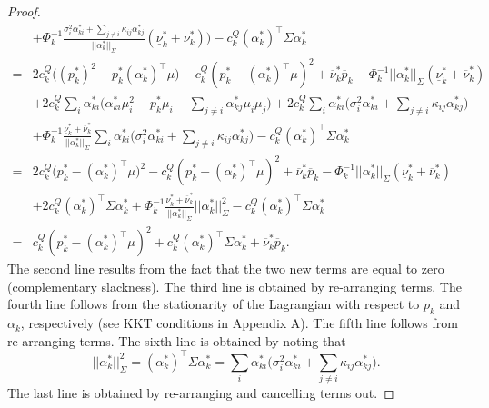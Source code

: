\documentclass{article}
\begin{document}
\begin{proof}
\begin{align*}
    &+ \Phi_k^{-1} \frac{\sigma_i^2 \alpha_{ki}^* + \sum_{j \ne i} \kappa_{ij} \alpha_{kj}^*}{||\alpha_k^*||_\Sigma}(\underline{\nu}_k^* +\overline{\nu}_k^*)\Big) - c_k^Q (\alpha_k^*)^\top\Sigma \alpha_k^*\\
    =& 2c_k^Q\big((p_k^*)^2 - p_k^*(\alpha_k^*)^\top \mu\big) - c_k^Q(p_k^* - (\alpha_k^*)^\top \mu)^2 + \overline{\nu}_k^* \overline{p}_k - \Phi_k^{-1}||\alpha_k^*||_{\Sigma} (\underline{\nu}_k^* + \overline{\nu}_k^*)\\ 
    &+ 2c_k^Q \sum_i \alpha_{ki}^*\big(\alpha_{ki}^*\mu_i^2 - p_k^* \mu_i - \sum_{j \ne i} \alpha_{kj}^* \mu_i \mu_j)  + 2c_k^Q \sum_i \alpha_{ki}^* \big(\sigma_i^2 \alpha_{ki}^* + \sum_{j \ne i} \kappa_{ij} \alpha_{kj}^*\big)\\
    &+ \Phi_k^{-1}\frac{\underline{\nu}_k^* +\overline{\nu}_k^*}{||\alpha_k^*||_\Sigma} \sum_i \alpha_{ki}^*\big(\sigma_i^2 \alpha_{ki}^* + \sum_{j \ne i} \kappa_{ij} \alpha_{kj}^*\big) - c_k^Q (\alpha_k^*)^\top\Sigma \alpha_k^*\\
    =& 2c_k^Q\big(p_k^* - (\alpha_k^*)^\top \mu\big)^2 - c_k^Q(p_k^* - (\alpha_k^*)^\top \mu)^2 + \overline{\nu}_k^* \overline{p}_k - \Phi_k^{-1}||\alpha_k^*||_{\Sigma} (\underline{\nu}_k^* + \overline{\nu}_k^*)\\ 
    &+ 2c_k^Q (\alpha_{k}^*)^\top \Sigma \alpha_k^* + \Phi_k^{-1}\frac{\underline{\nu}_k^* +\overline{\nu}_k^*}{||\alpha_k^*||_\Sigma} ||\alpha_k^*||_\Sigma^2 - c_k^Q (\alpha_k^*)^\top\Sigma \alpha_k^*\\
    =& c_k^Q(p_k^* - (\alpha_k^*)^\top \mu)^2 + c_k^Q (\alpha_k^*)^\top \Sigma \alpha_k^* + \overline{\nu}_k^* \overline{p}_k.
\end{align*}
The second line results from the fact that the two new terms are equal to zero (complementary slackness). The third line is obtained by re-arranging terms. The fourth line follows from the stationarity of the Lagrangian with respect to $p_k$ and $\alpha_k$, respectively (see KKT conditions in Appendix A). The fifth line follows from re-arranging terms. The sixth line is obtained by noting that
\begin{equation*}
||\alpha_k^*||_\Sigma^2 = (\alpha_k^*)^\top \Sigma \alpha_k^* = \sum_i \alpha_{ki}^*\big(\sigma_i^2 \alpha_{ki}^* + \sum_{j \ne i} \kappa_{ij} \alpha_{kj}^*\big).
\end{equation*}
The last line is obtained by re-arranging and cancelling terms out.


\end{proof}
\end{document}
